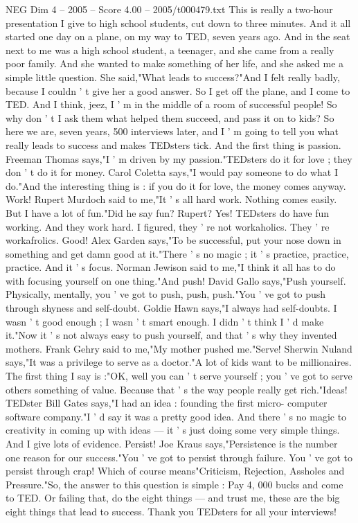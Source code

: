 \begin{textsample}{NEG Dim 4 – 2005 – Score 4.00 – 2005/t000479.txt}  \label{ex:f4_neg_069}
This is really a two-hour presentation I give to high school students, cut down to three minutes.
And it all started one day on a plane, on my way to TED, seven years ago.
And in the seat next to me was a high school student, a teenager, and she came from a really poor family.
And she wanted to make something of her life, and she asked me a simple little question.
She said,"What leads to success?"And I felt really badly, because I couldn ' t give her a good answer.
So I get off the plane, and I come to TED.
And I think, jeez, I ' m in the middle of a room of successful people!
So why don ' t I ask them what helped them succeed, and pass it on to kids?
So here we are, seven years, 500 interviews later, and I ' m going to tell you what really leads to success and makes TEDsters tick.
And the first thing is passion.
Freeman Thomas says,"I ' m driven by my passion."TEDsters do it for love ; they don ' t do it for money.
Carol Coletta says,"I would pay someone to do what I do."And the interesting thing is : if you do it for love, the money comes anyway.
Work!
Rupert Murdoch said to me,"It ' s all hard work.
Nothing comes easily.
But I have a lot of fun."Did he say fun?
Rupert?
Yes!
TEDsters do have fun working.
And they work hard.
I figured, they ' re not workaholics.
They ' re workafrolics.
Good!
Alex Garden says,"To be successful, put your nose down in something and get damn good at it."There ' s no magic ; it ' s practice, practice, practice.
And it ' s focus.
Norman Jewison said to me,"I think it all has to do with focusing yourself on one thing."And push!
David Gallo says,"Push yourself.
Physically, mentally, you ' ve got to push, push, push."You ' ve got to push through shyness and self-doubt.
Goldie Hawn says,"I always had self-doubts.
I wasn ' t good enough ; I wasn ' t smart enough.
I didn ' t think I ' d make it."Now it ' s not always easy to push yourself, and that ' s why they invented mothers.
Frank Gehry said to me,"My mother pushed me."Serve!
Sherwin Nuland says,"It was a privilege to serve as a doctor."A lot of kids want to be millionaires.
The first thing I say is :"OK, well you can ' t serve yourself ; you ' ve got to serve others something of value.
Because that ' s the way people really get rich."Ideas!
TEDster Bill Gates says,"I had an idea : founding the first micro- computer software company."I ' d say it was a pretty good idea.
And there ' s no magic to creativity in coming up with ideas — it ' s just doing some very simple things.
And I give lots of evidence.
Persist!
Joe Kraus says,"Persistence is the number one reason for our success."You ' ve got to persist through failure.
You ' ve got to persist through crap!
Which of course means"Criticism, Rejection, Assholes and Pressure."So, the answer to this question is simple : Pay 4, 000 bucks and come to TED.
Or failing that, do the eight things — and trust me, these are the big eight things that lead to success.
Thank you TEDsters for all your interviews!

\end{textsample}
